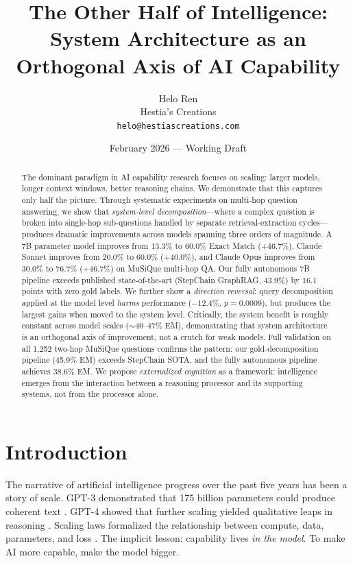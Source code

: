 \documentclass[11pt]{article}
\title{\textbf{The Other Half of Intelligence:} \\
\large System Architecture as an Orthogonal Axis of AI Capability}
\author{
  Helo Ren \\
  Hestia's Creations \\
  \texttt{helo@hestiascreations.com}
}
\date{February 2026 — Working Draft}
\begin{document}
\maketitle
\thispagestyle{empty}

\begin{abstract}
The dominant paradigm in AI capability research focuses on scaling: larger models, longer context windows, better reasoning chains. We demonstrate that this captures only half the picture. Through systematic experiments on multi-hop question answering, we show that \emph{system-level decomposition}---where a complex question is broken into single-hop sub-questions handled by separate retrieval-extraction cycles---produces dramatic improvements across models spanning three orders of magnitude. A 7B parameter model improves from 13.3\% to 60.0\% Exact Match (+46.7\%), Claude Sonnet improves from 20.0\% to 60.0\% (+40.0\%), and Claude Opus improves from 30.0\% to 76.7\% (+46.7\%) on MuSiQue multi-hop QA. Our fully autonomous 7B pipeline exceeds published state-of-the-art (StepChain GraphRAG, 43.9\%) by 16.1 points with zero gold labels. We further show a \emph{direction reversal}: query decomposition applied at the model level \emph{harms} performance ($-12.4\%$, $p=0.0009$), but produces the largest gains when moved to the system level. Critically, the system benefit is roughly constant across model scales ($\sim$40--47\% EM), demonstrating that system architecture is an orthogonal axis of improvement, not a crutch for weak models. Full validation on all 1,252 two-hop MuSiQue questions confirms the pattern: our gold-decomposition pipeline (45.9\% EM) exceeds StepChain SOTA, and the fully autonomous pipeline achieves 38.6\% EM. We propose \emph{externalized cognition} as a framework: intelligence emerges from the interaction between a reasoning processor and its supporting systems, not from the processor alone.
\end{abstract}

\section{Introduction}
\label{sec:intro}

The narrative of artificial intelligence progress over the past five years has been a story of scale. GPT-3 demonstrated that 175 billion parameters could produce coherent text \citep{brown2020language}. GPT-4 showed that further scaling yielded qualitative leaps in reasoning \citep{openai2023gpt4}. Scaling laws formalized the relationship between compute, data, parameters, and loss \citep{kaplan2020scaling, hoffmann2022training}. The implicit lesson: capability lives \emph{in the model}. To make AI more capable, make the model bigger.
\end{document}
